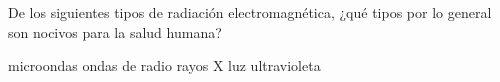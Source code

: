 De los siguientes tipos de radiación electromagnética, ¿qué tipos por lo general son nocivos para la salud humana?

\begin{oneparcheckboxes}
    \choice microondas
    \choice ondas de radio
    \CorrectChoice rayos X
    \CorrectChoice luz ultravioleta
\end{oneparcheckboxes}